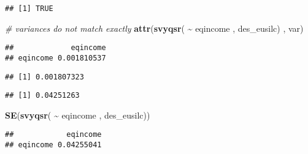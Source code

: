 \documentclass[
]{book}
\newenvironment{Shaded}{\begin{snugshade}}{\end{snugshade}}
\newcommand{\CommentTok}[1]{\textcolor[rgb]{0.56,0.35,0.01}{\textit{#1}}}
\newcommand{\FunctionTok}[1]{\textcolor[rgb]{0.13,0.29,0.53}{\textbf{#1}}}
\newcommand{\NormalTok}[1]{#1}
\newcommand{\SpecialCharTok}[1]{\textcolor[rgb]{0.81,0.36,0.00}{\textbf{#1}}}
\newcommand{\StringTok}[1]{\textcolor[rgb]{0.31,0.60,0.02}{#1}}
\begin{document}
\begin{verbatim}
## [1] TRUE
\end{verbatim}

\begin{Shaded}
\begin{Highlighting}[]
\CommentTok{\# variances do not match exactly}
\FunctionTok{attr}\NormalTok{(}\FunctionTok{svyqsr}\NormalTok{( }\SpecialCharTok{\textasciitilde{}}\NormalTok{ eqincome , des\_eusilc) , }\StringTok{\textquotesingle{}var\textquotesingle{}}\NormalTok{)}
\end{Highlighting}
\end{Shaded}

\begin{verbatim}
##             eqincome
## eqincome 0.001810537
\end{verbatim}

\begin{Shaded}
\end{Shaded}

\begin{verbatim}
## [1] 0.001807323
\end{verbatim}

\begin{Shaded}
\end{Shaded}

\begin{verbatim}
## [1] 0.04251263
\end{verbatim}

\begin{Shaded}
\begin{Highlighting}[]
\FunctionTok{SE}\NormalTok{(}\FunctionTok{svyqsr}\NormalTok{( }\SpecialCharTok{\textasciitilde{}}\NormalTok{ eqincome , des\_eusilc))}
\end{Highlighting}
\end{Shaded}

\begin{verbatim}
##            eqincome
## eqincome 0.04255041
\end{verbatim}
\end{document}
